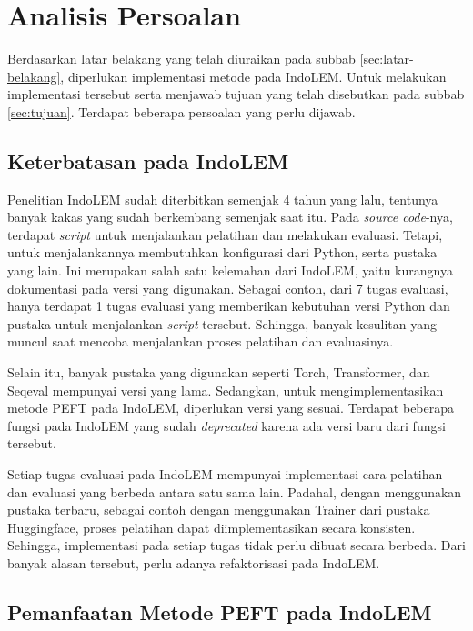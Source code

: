 \section{Analisis Persoalan}
\label{sec:analisis-persoalan}

Berdasarkan latar belakang yang telah diuraikan pada subbab \ref{sec:latar-belakang}, diperlukan implementasi metode \PEFT pada IndoLEM. Untuk melakukan implementasi tersebut serta menjawab tujuan yang telah disebutkan pada subbab \ref{sec:tujuan}. Terdapat beberapa persoalan yang perlu dijawab.

\subsection{Keterbatasan pada IndoLEM}

Penelitian IndoLEM sudah diterbitkan semenjak 4 tahun yang lalu, tentunya banyak kakas yang sudah berkembang semenjak saat itu. Pada \textit{source code}-nya, terdapat \textit{script} untuk menjalankan pelatihan dan melakukan evaluasi. Tetapi, untuk menjalankannya membutuhkan konfigurasi dari Python, serta pustaka yang lain. Ini merupakan salah satu kelemahan dari IndoLEM, yaitu kurangnya dokumentasi pada versi yang digunakan. Sebagai contoh, dari 7 tugas evaluasi, hanya terdapat 1 tugas evaluasi yang memberikan kebutuhan versi Python dan pustaka untuk menjalankan \textit{script} tersebut. Sehingga, banyak kesulitan yang muncul saat mencoba menjalankan proses pelatihan dan evaluasinya.

Selain itu, banyak pustaka yang digunakan seperti Torch, Transformer, dan Seqeval mempunyai versi yang lama. Sedangkan, untuk mengimplementasikan metode PEFT pada IndoLEM, diperlukan versi yang sesuai. Terdapat beberapa fungsi pada IndoLEM yang sudah \textit{deprecated} karena ada versi baru dari fungsi tersebut.

Setiap tugas evaluasi pada IndoLEM mempunyai implementasi cara pelatihan dan evaluasi yang berbeda antara satu sama lain. Padahal, dengan menggunakan pustaka terbaru, sebagai contoh dengan menggunakan Trainer dari pustaka Huggingface, proses pelatihan dapat diimplementasikan secara konsisten. Sehingga, implementasi pada setiap tugas tidak perlu dibuat secara berbeda. Dari banyak alasan tersebut, perlu adanya refaktorisasi pada IndoLEM.

\subsection{Pemanfaatan Metode PEFT pada IndoLEM}

